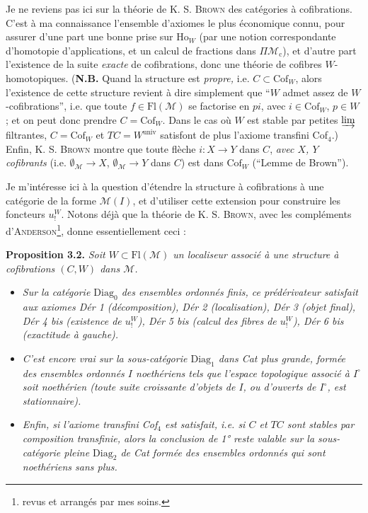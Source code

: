 \documentclass[11pt]{article}
\newcommand{\printedpage}[1]{\marginpar{\footnotesize p.~#1}}
\newcommand{\msp}[1]{\marginpar{\footnotesize [#1]}}
\newcommand{\M}{\mathcal{M}}
\newcommand{\Fl}{\mathrm{Fl}}
\newcommand{\Ho}{\mathrm{Ho}}
\newcommand{\Cof}{\mathrm{Cof}}
\newcommand{\Diag}{\mathrm{Diag}}
\begin{document}
\msp{page 35}
Je ne reviens pas ici sur la théorie de K. S. \textsc{Brown} des catégories à cofibrations. C'est à ma connaissance l'ensemble d'axiomes le plus économique connu, pour assurer d'une part une bonne prise sur $\Ho_W$ (par une notion correspondante d'homotopie d'applications, et un calcul de fractions dans $\Pi\M_{\mathrm{c}}$), et d'autre part l'existence de la suite \textit{exacte} de cofibrations, donc une théorie de cofibres $W$-homotopiques. (\textbf{N.B.} Quand la structure est \textit{propre,} i.e. $C\subset\Cof_W$, alors l'existence de cette structure revient à dire simplement que ``$W$ admet assez de $W$-cofibrations'', i.e. que toute $f\in\Fl(\M)$ se factorise en $pi$, avec $i\in\Cof_W$, $p\in W$ ; et on peut donc prendre $C=\Cof_W$. Dans le cas où $W$ est stable par petites $\varinjlim$ filtrantes, $C=\Cof_W$ et $TC=W^{\mathrm{univ}}$ satisfont de plus l'axiome transfini Cof$_4$.) Enfin, K. S. \textsc{Brown} montre que toute flèche $i : X\longrightarrow Y$ dans $C$, \textit{avec $X$, $Y$ cofibrants} (i.e. $\emptyset_{\M}\longrightarrow X$, $\emptyset_{\M}\longrightarrow Y$ dans $C$) est dans $\Cof_W$ (``Lemme de Brown'').

Je m'intéresse ici à la question d'étendre la structure à cofibrations à une catégorie de la forme $\M(I)$, et d'utiliser cette extension pour construire
\msp{page 36}
les foncteurs $u^{W}_{!}$. Notons déjà que la théorie de K. S. \textsc{Brown}, avec les compléments d'\textsc{Anderson}\footnote[20]{revus et arrangés par mes soins.}, donne essentiellement ceci :

\printedpage{21}

\textbf{Proposition 3.2.} \textit{Soit $W\subset\Fl(\M)$ un localiseur associé à une structure à cofibrations $(C,W)$ dans $\M$.}
\begin{itemize}[leftmargin=3em,labelwidth=2.5em,align=right]
\item[1°)] \textit{Sur la catégorie \textup{$\Diag_0$} des ensembles ordonnés \textup{finis}, ce prédérivateur satisfait aux axiomes Dér 1 (décomposition), Dér 2 (localisation), Dér 3 (objet final), Dér 4 bis (existence de $u^{W}_{!}$), Dér 5 bis (calcul des fibres de $u^{W}_{!}$), Dér 6 bis (exactitude à gauche).}
\item[2°)] \textit{C'est encore vrai sur la sous-catégorie \textup{$\Diag_1$} dans \textup{Cat} plus grande, formée des ensembles ordonnés $I$ \textup{noethériens} tels que l'espace topologique associé à $I^{\circ}$ soit noethérien (toute suite croissante d'objets de $I$, ou d'ouverts de $I^{\circ}$, est stationnaire).}
\item[3°)] \textit{Enfin, si l'axiome transfini Cof$_4$ est satisfait, i.e. si $C$ et $TC$ sont stables par composition transfinie, alors la conclusion de \textup{1°} reste valable sur la sous-catégorie pleine \textup{$\Diag_2$} de \textup{Cat} formée des ensembles ordonnés qui sont noethériens sans plus.}
\end{itemize}
\end{document}

